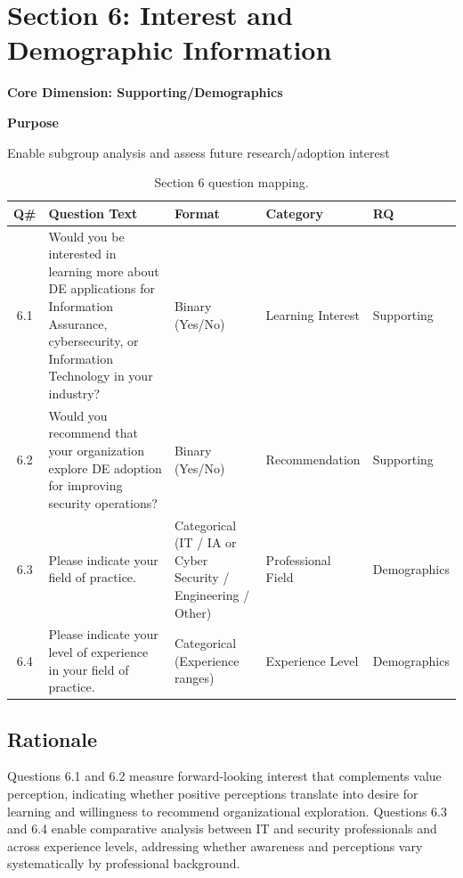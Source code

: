   \section{Section 6: Interest and Demographic Information}

  \textbf{Core Dimension: Supporting/Demographics}

  \textbf{Purpose}

  Enable subgroup analysis and assess future research/adoption interest

  \begin{table}[H]
    \centering
    \caption{Section 6 question mapping.}
    \label{tab:section6-mapping}
    \small
    \begin{tabular}{@{}cp{2in}p{1.1in}p{1in}l@{}}
      \toprule
      \textbf{Q\#} & \textbf{Question Text} & \textbf{Format} & \textbf{Category} & \textbf{RQ} \\
      \midrule
      6.1 & Would you be interested in learning more about DE applications for Information Assurance, cybersecurity, or Information Technology in your industry? & Binary (Yes/No) & Learning Interest & Supporting \\
      6.2 & Would you recommend that your organization explore DE adoption for improving security operations? & Binary (Yes/No) & Recommendation & Supporting \\
      6.3 & Please indicate your field of practice. & Categorical (IT / IA or Cyber Security / Engineering / Other) & Professional Field & Demographics \\
      6.4 & Please indicate your level of experience in your field of practice. & Categorical (Experience ranges) & Experience Level & Demographics \\
      \bottomrule
    \end{tabular}
  \end{table}

  \subsection{Rationale}

  Questions 6.1 and 6.2 measure forward-looking interest that complements value perception, indicating whether positive perceptions translate into desire for learning and willingness to recommend organizational exploration. Questions 6.3 and 6.4 enable comparative analysis between IT and security professionals and across experience levels, addressing whether awareness and perceptions vary systematically by professional background.

